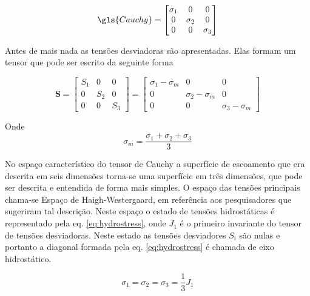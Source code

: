 \begin{equation}
\gls{Cauchy} = 
    \begin{bmatrix}
    \sigma_1 & 0 & 0 \\
    0 & \sigma_2 & 0 \\
    0 & 0 & \sigma_3
    \end{bmatrix}
\end{equation}

Antes de mais nada as tensões desviadoras são apresentadas. Elas formam um tensor que pode ser escrito da seguinte forma

\begin{equation}
\boldsymbol{S} = 
    \begin{bmatrix}
    S_1 & 0 & 0 \\
    0 & S_2 & 0 \\
    0 & 0 & S_3
    \end{bmatrix} = \begin{bmatrix}
    \sigma_1 - \sigma_m & 0 & 0 \\
    0 & \sigma_2 - \sigma_m & 0 \\
    0 & 0 & \sigma_3 - \sigma_m
    \end{bmatrix}
\end{equation}

Onde 
\begin{equation}
     \sigma_m = \frac{\sigma_1 + \sigma_2 + \sigma_3}{3}
\end{equation}

No espaço característico do tensor de Cauchy a superfície de escoamento que era descrita em seis dimensões torna-se uma superfície em três dimensões, que pode ser descrita e entendida de forma mais simples. O espaço das tensões principais chama-se Espaço de Haigh-Westergaard, em referência aos pesquisadores que sugeriram tal descrição. Neste espaço o estado de tensões hidrostáticas é representado pela eq. \ref{eq:hydrostress}, onde $ J_1 $ é o primeiro invariante do tensor de tensões desviadoras. Neste estado as tensões desviadores $S_i$ são nulas e portanto a diagonal formada pela eq. \ref{eq:hydrostress} é chamada de eixo hidrostático.  

\begin{equation} \label{eq:hydrostress}
    \sigma_1 = \sigma_2 = \sigma_3 = \frac{1}{3} J_1
\end{equation}

